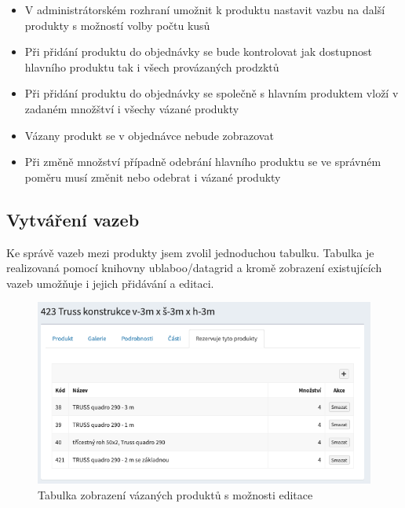 \begin{itemize}
    \item V administrátorském rozhraní umožnit k produktu nastavit vazbu na další produkty s možností volby počtu kusů
    \item Při přidání produktu do objednávky se bude kontrolovat jak dostupnost hlavního produktu tak i všech provázaných prodzktů
    \item Při přidání produktu do objednávky se společně s hlavním produktem vloží v zadaném množštví i všechy vázané produkty
    \item Vázany produkt se v objednávce nebude zobrazovat
    \item Při změně množství případně odebrání hlavního produktu se ve správném poměru musí změnit nebo odebrat i vázané produkty

\end{itemize}

\subsection{Vytváření vazeb}

Ke správě vazeb mezi produkty jsem zvolil jednoduchou tabulku. Tabulka je realizovaná pomocí knihovny ublaboo/datagrid \cite{contributteContributteDatagrid} a kromě zobrazení existujících vazeb umožňuje i jejich přidávání a editaci.

\begin{figure}
    \centering
    \includegraphics[width=0.75\linewidth]{vazane-produkty.png}
    \caption{Tabulka zobrazení vázaných produktů s možnosti editace}
    \label{fig:enter-label}
\end{figure}



